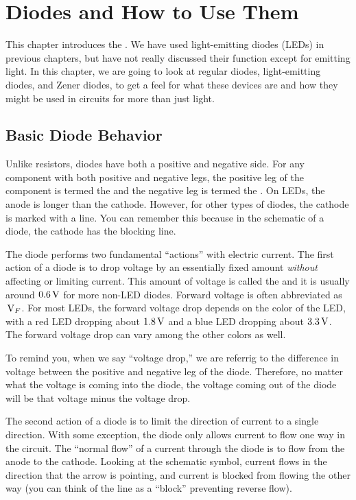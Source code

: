 \chapter{Diodes and How to Use Them}
\label{chapDiodes}

This chapter introduces the .  
We have used light-emitting diodes (LEDs) in previous chapters, but have not really discussed their function except for emitting light.
In this chapter, we are going to look at regular diodes, light-emitting diodes, and Zener diodes, to get a feel for what these devices are and how they might be used in circuits for more than just light.


\section{Basic Diode Behavior}

Unlike resistors, diodes have both a positive and negative side.
For any component with both positive and negative legs, the positive leg of the component is termed the  and the negative leg is termed the .
On LEDs, the anode is longer than the cathode.
However, for other types of diodes, the cathode is marked with a line.
You can remember this because in the schematic of a diode, the cathode has the blocking line.

The diode performs two fundamental ``actions'' with electric current.  
The first action of a diode is to drop voltage by an essentially fixed amount \emph{without} affecting or limiting current.
This amount of voltage is called the  and it is usually around $0.6\,\si{\volt}$ for more non-LED diodes. 
Forward voltage is often abbreviated as $\,\si{\volt}_F$.
For most LEDs, the forward voltage drop depends on the color of the LED, with a red LED dropping about $1.8\,\si{\volt}$ and a blue LED dropping about $3.3\,\si{\volt}$.
The forward voltage drop can vary among the other colors as well.

To remind you, when we say ``voltage drop,'' we are referrig to the difference in voltage between the positive and negative leg of the diode.
Therefore, no matter what the voltage is coming into the diode, the voltage coming out of the diode will be that voltage minus the voltage drop.

The second action of a diode is to limit the direction of current to a single direction.
With some exception, the diode only allows current to flow one way in the circuit.
The ``normal flow'' of a current through the diode is to flow from the anode to the cathode.
Looking at the schematic symbol, current flows in the direction that the arrow is pointing, and current is blocked from flowing the other way (you can think of the line as a ``block'' preventing reverse flow).


